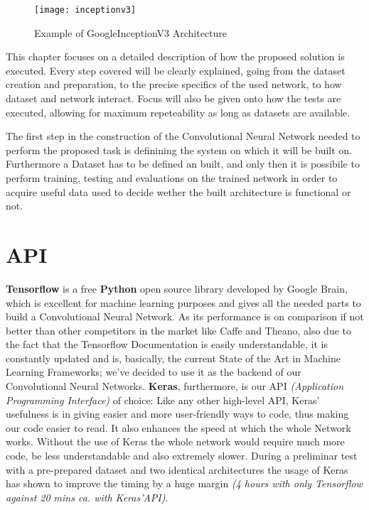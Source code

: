 \documentclass[../main.tex]{subfiles}
\begin{document}
\label{capitolo3}
\thispagestyle{empty}

\begin{figure}[b]
\caption{Example of GoogleInceptionV3 Architecture}
\centering
\texttt{[image: inceptionv3]}
\label{inceptionv3}
\end{figure}

This chapter focuses on a detailed description of how the proposed solution is executed. Every step covered will be clearly explained, going from the dataset creation and preparation, to the precise specifics of the used network, to how dataset and network interact. Focus will also be given onto how the tests are executed, allowing for maximum repeteability as long as datasets are available.

The first step in the construction of the Convolutional Neural Network needed to perform the proposed task is definining the system on which it will be built on. Furthermore a Dataset has to be defined an built, and only then it is possibile to perform training, testing and evaluations on the trained network in order to acquire useful data used to decide wether the built architecture is functional or not. 

\section{API}
\textbf{Tensorflow} is a free \textbf{Python} open source library developed by Google Brain, which is excellent for machine learning purposes\cite{Tensorflow2017} and gives all the needed parts to build a Convolutional Neural Network. As its performance is on comparison if not better than other competitors in the market like Caffe and Theano, also due to the fact that the Tensorflow Documentation is easily understandable, it is constantly updated and is, basically, the current State of the Art in Machine Learning Frameworks; we've decided to use it as the backend of our Convolutional Neural Networks. \textbf{Keras}, furthermore, is our API \textit{(Application Programming Interface)} of choice: Like any other high-level API, Keras' usefulness is in giving easier and more user-friendly ways to code, thus making our code easier to read. It also enhances the speed at which the whole Network works. Without the use of Keras the whole network would require much more code, be less understandable and also extremely slower. During a preliminar test with a pre-prepared dataset and two identical architectures the usage of Keras has shown to improve the timing by a huge margin \textit{(4 hours with only Tensorflow against 20 mins ca. with Keras'API)}. 
\end{document}
